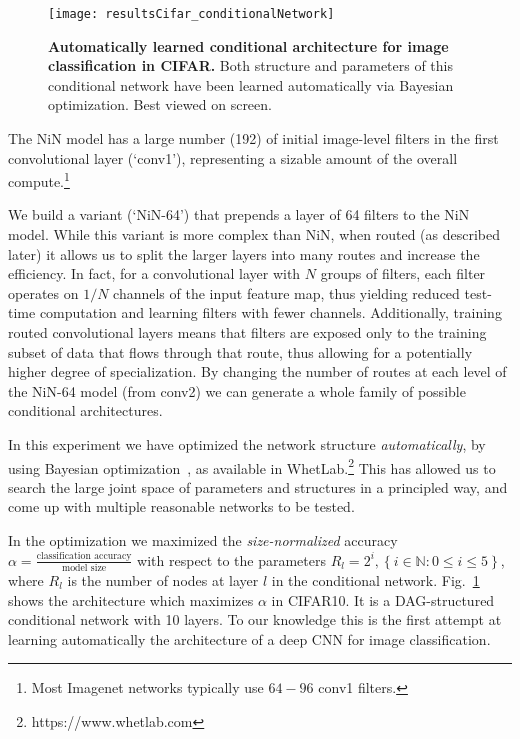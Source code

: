\documentclass[thesis]{subfiles}
\begin{document}
\begin{figure}[t]
\centerline{
\texttt{[image: resultsCifar\_conditionalNetwork]}
}
   \caption{{\bf Automatically learned conditional architecture for image classification in CIFAR.} Both structure and parameters of this conditional network have been learned automatically via Bayesian optimization.
Best viewed on screen.}
\label{fig:Cifar_CondNet}
\end{figure}

The NiN model has a large number (192) of initial image-level filters in the first convolutional layer (`conv1'), 
representing a sizable amount of the overall compute.\footnote{Most Imagenet networks typically use $64-96$ conv1 filters.}

We build a variant (`NiN-64') that prepends a layer of 64 filters to the NiN model.
While this variant is more complex than NiN, when routed (as described later) it allows us 
to split the larger layers into many routes and increase the efficiency.
In fact, for a convolutional layer with $N$ groups of filters, each filter operates on $1/N$ channels of the input feature map, thus yielding reduced test-time computation and learning filters with fewer channels. 
Additionally, training routed convolutional layers means that filters are exposed only to the training subset of data that flows through that route, thus allowing for a potentially higher degree of specialization.
By changing the number of routes at each level of the NiN-64 model (from conv2) we can 
generate a whole family of possible conditional architectures. 

In this experiment we have optimized the network structure {\em automatically}, 
by using Bayesian optimization~\cite{Snoek2012}, as available in WhetLab.\footnote{https://www.whetlab.com} 
This has allowed us to search the large joint space of parameters and structures in a principled way, 
and come up with multiple reasonable networks to be tested. 

In the optimization we maximized the {\em size-normalized} accuracy $\alpha =\frac{\textrm{classification accuracy}}{\textrm{model size}}$ with respect to the parameters $R_l = 2^i, \left\{i\in \mathbb{N} : 0 \le i \le 5\right\}$, where $R_l$ is the number of nodes at layer $l$ in the conditional network. 
Fig.~\ref{fig:Cifar_CondNet} shows the architecture which maximizes $\alpha$ in CIFAR10. 
It is a DAG-structured conditional network with 10 layers.
To our knowledge this is the first attempt at learning automatically the architecture of a deep CNN for image classification.
\end{document}
